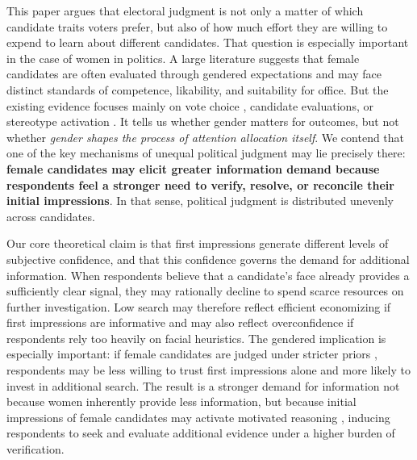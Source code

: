\documentclass[11pt]{article}
\begin{document}
This paper argues that electoral judgment is not only a matter of which candidate traits voters prefer, but also of how much effort they are willing to expend to learn about different candidates. That question is especially important in the case of women in politics. A large literature suggests that female candidates are often evaluated through gendered expectations and may face distinct standards of competence, likability, and suitability for office. But the existing evidence focuses mainly on vote choice \parencite{Bahamonde:2023}, candidate evaluations, or stereotype activation \parencite{Ditonto2018,Krook2020}. It tells us whether gender matters for outcomes, but not whether \emph{gender shapes the process of attention allocation itself}. We contend that one of the key mechanisms of unequal political judgment may lie precisely there: {\bf female candidates may elicit greater information demand because respondents feel a stronger need to verify, resolve, or reconcile their initial impressions}. In that sense, political judgment is distributed unevenly across candidates.

Our core theoretical claim is that first impressions generate different levels of subjective confidence, and that this confidence governs the demand for additional information. When respondents believe that a candidate's face already provides a sufficiently clear signal, they may rationally decline to spend scarce resources on further investigation. Low search may therefore reflect efficient economizing if first impressions are informative and may also reflect overconfidence if respondents rely too heavily on facial heuristics. The gendered implication is especially important: if female candidates are judged under stricter priors \parencite{Ditonto2018,Krook2020}, respondents may be less willing to trust first impressions alone and more likely to invest in additional search. The result is a stronger demand for information not because women inherently provide less information, but because initial impressions of female candidates may activate motivated reasoning \parencite{Kunda1990}, inducing respondents to seek and evaluate additional evidence under a higher burden of verification.
\end{document}
